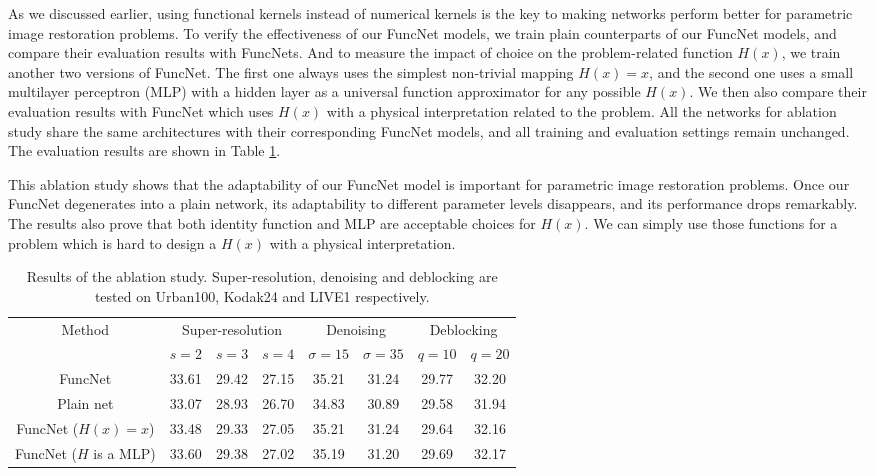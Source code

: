 \documentclass{article}
\begin{document}
As we discussed earlier, using functional kernels instead of numerical kernels is the key to making networks perform better for parametric image restoration problems. To verify the effectiveness of our FuncNet models, we train plain counterparts of our FuncNet models, and compare their evaluation results with FuncNets. And to measure the impact of choice on the problem-related function $H(x)$, we train another two versions of FuncNet. The first one always uses the simplest non-trivial mapping $H(x)=x$, and the second one uses a small multilayer perceptron (MLP) with a hidden layer as a universal function approximator for any possible $H(x)$. We then also compare their evaluation results with FuncNet which uses $H(x)$ with a physical interpretation related to the problem. All the networks for ablation study share the same architectures with their corresponding FuncNet models, and all training and evaluation settings remain unchanged. The evaluation results are shown in Table \ref{tab:table5}.

This ablation study shows that the adaptability of our FuncNet model is important for parametric image restoration problems. Once our FuncNet degenerates into a plain network, its adaptability to different parameter levels disappears, and its performance drops remarkably. The results also prove that both identity function and MLP are acceptable choices for $H(x)$. We can simply use those functions for a problem which is hard to design a $H(x)$ with a physical interpretation.

\begin{table}
\centering
\caption{Results of the ablation study. Super-resolution, denoising and deblocking are tested on Urban100, Kodak24 and LIVE1 respectively.}
\label{tab:table5}
\begin{tabular}{|c|c|c|c|c|c|c|c|}
\hline
\multirow{2}{*}{Method} & \multicolumn{3}{c|}{Super-resolution} & \multicolumn{2}{c|}{Denoising} & \multicolumn{2}{c|}{Deblocking} \\ \cline{2-8}
& $s=2$ & $s=3$ & $s=4$ & $\sigma=15$ & $\sigma=35$ & $q=10$ & $q=20$ \\ \hline
FuncNet & 33.61 & 29.42 & 27.15 & 35.21 & 31.24 & 29.77 & 32.20 \\
Plain net & 33.07 & 28.93 & 26.70 & 34.83 & 30.89 & 29.58 & 31.94 \\
FuncNet ($H(x)=x$) & 33.48 & 29.33 & 27.05 & 35.21 & 31.24 & 29.64 & 32.16 \\
FuncNet ($H$ is a MLP) & 33.60 & 29.38 & 27.02 & 35.19 & 31.20 & 29.69 & 32.17 \\ \hline
\end{tabular}
\end{table}
\end{document}
